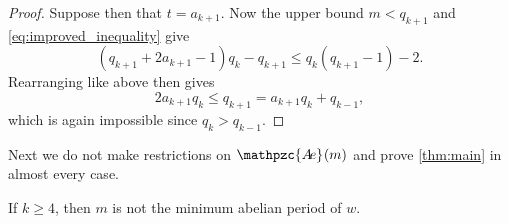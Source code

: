 \documentclass[a4paper,fleqn]{article}
\newcommand{\abexp}[2][]{\mathpzc{A\mkern-3mu e}_{#1}(#2)}
\begin{document}
\begin{proof}
    Suppose then that $t = a_{k+1}$. Now the upper bound $m < q_{k+1}$ and
    \eqref{eq:improved_inequality} give
    \begin{equation*}
      (q_{k+1} + 2a_{k+1} - 1)q_k - q_{k+1} \leq q_k(q_{k+1} - 1) - 2.
    \end{equation*}
    Rearranging like above then gives
    \begin{equation*}
      2a_{k+1}q_k \leq q_{k+1} = a_{k+1}q_k + q_{k-1},
    \end{equation*}
    which is again impossible since $q_k > q_{k-1}$.
  \end{proof}

  Next we do not make restrictions on $\abexp{m}$ and prove \autoref{thm:main} in almost every case.

  \begin{lemma}\label{lem:almost_all}
    If $k \geq 4$, then $m$ is not the minimum abelian period of $w$.
  \end{lemma}
\end{document}
